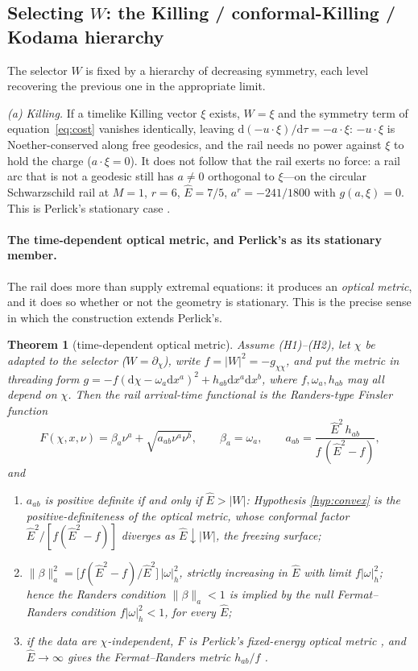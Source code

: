 \documentclass[12pt]{iopart}
\newcommand{\Ehat}{\hat E}
\newcommand{\dd}{\mathrm{d}}
\theoremstyle{plain}
\theoremstyle{definition}
\theoremstyle{plain}
\newtheorem{auxtheorem}[auxlemma]{Theorem}
\theoremstyle{remark}
\begin{document}
\subsection{Selecting $W$: the Killing / conformal-Killing / Kodama hierarchy}
\label{sec:whierarchy}
The selector $W$ is fixed by a hierarchy of decreasing symmetry, each level
recovering the previous one in the appropriate limit.

\emph{(a) Killing.} If a timelike Killing vector $\xi$ exists, $W=\xi$ and the
symmetry term of equation~\eqref{eq:cost} vanishes identically, leaving
$\dd(-u\cdot\xi)/\dd\tau=-a\cdot\xi$: $-u\cdot\xi$ is Noether-conserved along free
geodesics, and the rail needs no power against $\xi$ to hold the charge ($a\cdot\xi=0$). It
does not follow that the rail exerts no force: a rail arc that is not a geodesic still has
$a\neq0$ orthogonal to $\xi$---on the circular Schwarzschild rail at $M=1$, $r=6$,
$\Ehat=7/5$, $a^r=-241/1800$ with $g(a,\xi)=0$. This is Perlick's stationary case
\cite{Perlick1991}.

\paragraph{The time-dependent optical metric, and Perlick's as its stationary member.}
The rail does more than supply extremal equations: it produces an \emph{optical metric},
and it does so whether or not the geometry is stationary. This is the precise sense in
which the construction extends Perlick's.

\begin{auxtheorem}[time-dependent optical metric]\label{thm:optical}
Assume (H1)--(H2), let $\chi$ be adapted to the selector ($W=\partial_\chi$), write
$f=|W|^2=-g_{\chi\chi}$, and put the metric in threading form
$g=-f(\dd\chi-\omega_a\dd x^a)^2+h_{ab}\dd x^a\dd x^b$, where $f,\omega_a,h_{ab}$ may all
depend on $\chi$. Then the rail arrival-time functional is the Randers-type Finsler
function
\begin{equation}
   F(\chi,x,\nu)=\beta_a\nu^a+\sqrt{a_{ab}\nu^a\nu^b},
   \qquad \beta_a=\omega_a,\qquad
   a_{ab}=\frac{\Ehat^2\,h_{ab}}{f\,(\Ehat^2-f)},
   \label{eq:optical-metric}
\end{equation}
and
\begin{enumerate}
\item[(i)] $a_{ab}$ is positive definite \emph{if and only if} $\Ehat>|W|$: Hypothesis
\ref{hyp:convex} \emph{is} the positive-definiteness of the optical metric, whose conformal
factor $\Ehat^2/[f(\Ehat^2-f)]$ diverges as $\Ehat\downarrow|W|$, the freezing surface;
\item[(ii)] $\|\beta\|_a^2=\big[f(\Ehat^2-f)/\Ehat^2\big]\,|\omega|_h^2$, strictly
increasing in $\Ehat$ with limit $f|\omega|_h^2$; hence the Randers condition
$\|\beta\|_a<1$ is \emph{implied by} the null Fermat--Randers condition $f|\omega|_h^2<1$,
for every $\Ehat$;
\item[(iii)] if the data are $\chi$-independent, $F$ is Perlick's fixed-energy optical
metric \cite{Perlick1991}, and $\Ehat\to\infty$ gives the Fermat--Randers metric
$h_{ab}/f$ \cite{GibbonsWerner2008}.
\end{enumerate}
\end{auxtheorem}
\end{document}
